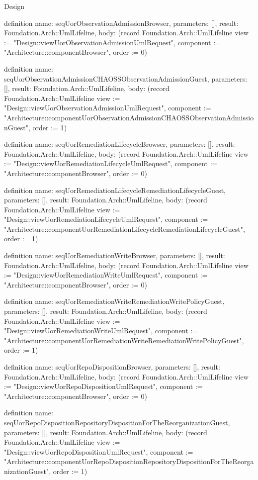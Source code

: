 \begin{lexlean}{Design}
\begin{semanticmodule}
definition{
  name: seqUorObservationAdmissionBrowser,
  parameters: [],
  result: Foundation.Arch::UmlLifeline,
  body: (record Foundation.Arch::UmlLifeline {view := "Design::viewUorObservationAdmissionUmlRequest", component := "Architecture::componentBrowser", order := 0})
}

definition{
  name: seqUorObservationAdmissionCHAOSSObservationAdmissionGuest,
  parameters: [],
  result: Foundation.Arch::UmlLifeline,
  body: (record Foundation.Arch::UmlLifeline {view := "Design::viewUorObservationAdmissionUmlRequest", component := "Architecture::componentUorObservationAdmissionCHAOSSObservationAdmissionGuest", order := 1})
}

definition{
  name: seqUorRemediationLifecycleBrowser,
  parameters: [],
  result: Foundation.Arch::UmlLifeline,
  body: (record Foundation.Arch::UmlLifeline {view := "Design::viewUorRemediationLifecycleUmlRequest", component := "Architecture::componentBrowser", order := 0})
}

definition{
  name: seqUorRemediationLifecycleRemediationLifecycleGuest,
  parameters: [],
  result: Foundation.Arch::UmlLifeline,
  body: (record Foundation.Arch::UmlLifeline {view := "Design::viewUorRemediationLifecycleUmlRequest", component := "Architecture::componentUorRemediationLifecycleRemediationLifecycleGuest", order := 1})
}

definition{
  name: seqUorRemediationWriteBrowser,
  parameters: [],
  result: Foundation.Arch::UmlLifeline,
  body: (record Foundation.Arch::UmlLifeline {view := "Design::viewUorRemediationWriteUmlRequest", component := "Architecture::componentBrowser", order := 0})
}

definition{
  name: seqUorRemediationWriteRemediationWritePolicyGuest,
  parameters: [],
  result: Foundation.Arch::UmlLifeline,
  body: (record Foundation.Arch::UmlLifeline {view := "Design::viewUorRemediationWriteUmlRequest", component := "Architecture::componentUorRemediationWriteRemediationWritePolicyGuest", order := 1})
}

definition{
  name: seqUorRepoDispositionBrowser,
  parameters: [],
  result: Foundation.Arch::UmlLifeline,
  body: (record Foundation.Arch::UmlLifeline {view := "Design::viewUorRepoDispositionUmlRequest", component := "Architecture::componentBrowser", order := 0})
}

definition{
  name: seqUorRepoDispositionRepositoryDispositionForTheReorganizationGuest,
  parameters: [],
  result: Foundation.Arch::UmlLifeline,
  body: (record Foundation.Arch::UmlLifeline {view := "Design::viewUorRepoDispositionUmlRequest", component := "Architecture::componentUorRepoDispositionRepositoryDispositionForTheReorganizationGuest", order := 1})
}


\end{semanticmodule}
\end{lexlean}

